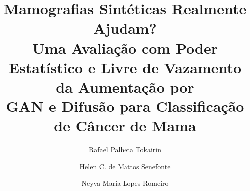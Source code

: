 \documentclass[runningheads]{llncs}
\begin{document}
\title{Mamografias Sintéticas Realmente Ajudam?\\
Uma Avaliação com Poder Estatístico e Livre de Vazamento da Aumentação por\\
GAN e Difusão para Classificação de Câncer de Mama}

\author{Rafael Palheta Tokairin \and
Helen C. de Mattos Senefonte \and
Neyva Maria Lopes Romeiro}

\maketitle
\end{document}
